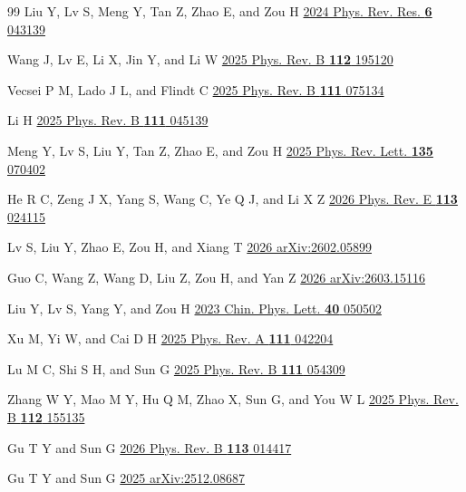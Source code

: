 \documentclass[aps,prb,floatfix,superscriptaddress,reprint]{revtex4-2}
\begin{document}
\begin{thebibliography}{99}
Liu Y, Lv S, Meng Y, Tan Z, Zhao E, and Zou H \href{https://doi.org/10.1103/PhysRevResearch.6.043139}{2024 Phys. Rev. Res. \textbf{6} 043139}

Wang J, Lv E, Li X, Jin Y, and Li W \href{https://doi.org/10.1103/hgwk-pzw2}{2025 Phys. Rev. B \textbf{112} 195120}

Vecsei P M, Lado J L, and Flindt C \href{https://doi.org/10.1103/PhysRevB.111.075134}{2025 Phys. Rev. B \textbf{111} 075134}

Li H \href{https://doi.org/10.1103/PhysRevB.111.045139}{2025 Phys. Rev. B \textbf{111} 045139}

Meng Y, Lv S, Liu Y, Tan Z, Zhao E, and Zou H \href{https://doi.org/10.1103/glc5-hv2m}{2025 Phys. Rev. Lett. \textbf{135} 070402}

He R C, Zeng J X, Yang S, Wang C, Ye Q J, and Li X Z \href{https://doi.org/10.1103/m1py-qtt5}{2026 Phys. Rev. E \textbf{113} 024115}

Lv S, Liu Y, Zhao E, Zou H, and Xiang T \href{https://arxiv.org/abs/2602.05899}{2026 arXiv:2602.05899}

Guo C, Wang Z, Wang D, Liu Z, Zou H, and Yan Z \href{https://arxiv.org/abs/2603.15116}{2026 arXiv:2603.15116}

Liu Y, Lv S, Yang Y, and Zou H \href{https://doi.org/10.1088/0256-307X/40/5/050502}{2023 Chin. Phys. Lett. \textbf{40} 050502}


Xu M, Yi W, and Cai D H \href{https://doi.org/10.1103/PhysRevA.111.042204}{2025 Phys. Rev. A \textbf{111} 042204}

Lu M C, Shi S H, and Sun G \href{https://doi.org/10.1103/PhysRevB.111.054309}{2025 Phys. Rev. B \textbf{111} 054309}

Zhang W Y, Mao M Y, Hu Q M, Zhao X, Sun G, and You W L \href{https://doi.org/10.1103/vlfm-jfq5}{2025 Phys. Rev. B \textbf{112} 155135}

Gu T Y and Sun G \href{https://doi.org/10.1103/3x34-f53v}{2026 Phys. Rev. B \textbf{113} 014417}

Gu T Y and Sun G \href{https://arxiv.org/abs/2512.08687}{2025 arXiv:2512.08687}


\end{thebibliography}
\end{document}
